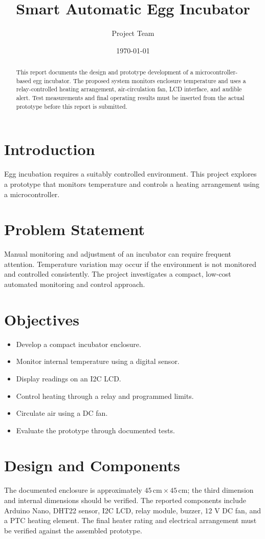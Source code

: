 \documentclass[12pt,a4paper]{report}
\title{Smart Automatic Egg Incubator}
\author{Project Team}
\date{\today}
\begin{document}
\maketitle

\begin{abstract}
This report documents the design and prototype development of a microcontroller-based egg incubator. The proposed system monitors enclosure temperature and uses a relay-controlled heating arrangement, air-circulation fan, LCD interface, and audible alert. Test measurements and final operating results must be inserted from the actual prototype before this report is submitted.
\end{abstract}

\tableofcontents

\chapter{Introduction}
Egg incubation requires a suitably controlled environment. This project explores a prototype that monitors temperature and controls a heating arrangement using a microcontroller.

\chapter{Problem Statement}
Manual monitoring and adjustment of an incubator can require frequent attention. Temperature variation may occur if the environment is not monitored and controlled consistently. The project investigates a compact, low-cost automated monitoring and control approach.

\chapter{Objectives}
\begin{itemize}
  \item Develop a compact incubator enclosure.
  \item Monitor internal temperature using a digital sensor.
  \item Display readings on an I2C LCD.
  \item Control heating through a relay and programmed limits.
  \item Circulate air using a DC fan.
  \item Evaluate the prototype through documented tests.
\end{itemize}

\chapter{Design and Components}
The documented enclosure is approximately $45\,\mathrm{cm}\times45\,\mathrm{cm}$; the third dimension and internal dimensions should be verified. The reported components include Arduino Nano, DHT22 sensor, I2C LCD, relay module, buzzer, 12 V DC fan, and a PTC heating element. The final heater rating and electrical arrangement must be verified against the assembled prototype.
\end{document}
